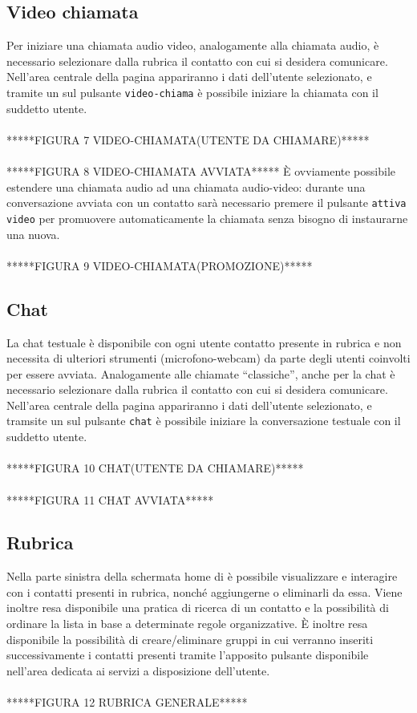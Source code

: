 \subsection{Video chiamata}
Per iniziare una chiamata audio video, analogamente alla chiamata audio, è necessario selezionare dalla rubrica il contatto con cui si desidera comunicare. Nell'area centrale della pagina appariranno i dati dell'utente selezionato, e tramite un  sul pulsante 
\texttt{video-chiama} è possibile iniziare la chiamata con il suddetto utente.
\\\\*****FIGURA 7 VIDEO-CHIAMATA(UTENTE DA CHIAMARE)*****
\\\\*****FIGURA 8 VIDEO-CHIAMATA AVVIATA*****
È ovviamente possibile estendere una chiamata audio ad una chiamata audio-video: durante una conversazione avviata con un contatto sarà necessario premere il pulsante \texttt{attiva video} per promuovere automaticamente la chiamata senza bisogno di instaurarne una nuova.
\\\\*****FIGURA 9 VIDEO-CHIAMATA(PROMOZIONE)*****
\subsection{Chat}
La chat testuale è disponibile con ogni utente contatto presente in rubrica e non necessita di ulteriori strumenti (microfono-webcam) da parte degli utenti coinvolti per essere avviata. Analogamente alle chiamate ``classiche'', anche per la chat è necessario selezionare dalla rubrica il contatto con cui si desidera comunicare. Nell'area centrale della pagina appariranno i dati dell'utente selezionato, e tramsite un  sul pulsante \texttt{chat} è possibile iniziare la conversazione testuale con il suddetto utente.
\\\\*****FIGURA 10 CHAT(UTENTE DA CHIAMARE)*****
\\\\*****FIGURA 11 CHAT AVVIATA*****
\subsection{Rubrica}
Nella parte sinistra della schermata home di \caName{} è possibile visualizzare e interagire con i contatti presenti in rubrica, nonché aggiungerne o eliminarli da essa. 
Viene inoltre resa disponibile una pratica  di ricerca di un contatto e la possibilità di ordinare la lista in base a determinate regole organizzative. È inoltre resa disponibile la possibilità di creare/eliminare gruppi in cui verranno inseriti successivamente i contatti presenti tramite l'apposito pulsante disponibile nell'area dedicata ai servizi a disposizione dell'utente.
\\\\*****FIGURA 12 RUBRICA GENERALE*****
